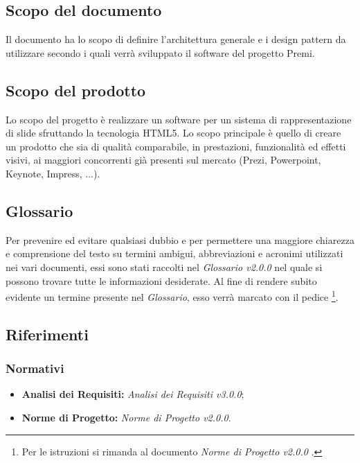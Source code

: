 \subsection{Scopo del documento}
	Il documento ha lo scopo di definire l'architettura generale e i \gls{design pattern} da utilizzare secondo i quali verrà sviluppato il software del progetto Premi.
	
\subsection{Scopo del prodotto}
Lo scopo del progetto è realizzare un software per un sistema di rappresentazione di \gls{slide} sfruttando la tecnologia  \gls{HTML5}. Lo scopo principale è quello di creare un prodotto che sia di qualità comparabile, in prestazioni, funzionalità ed effetti visivi, ai maggiori concorrenti già presenti sul mercato (Prezi, Powerpoint, Keynote, Impress, ...).

\subsection{Glossario}
Per prevenire ed evitare qualsiasi dubbio e per permettere una maggiore chiarezza e comprensione del testo su termini ambigui, abbreviazioni e acronimi utilizzati nei vari documenti, essi sono stati raccolti nel \textit{Glossario v2.0.0} nel quale si possono trovare tutte le informazioni desiderate.
Al fine di rendere subito evidente un termine presente nel \textit{Glossario}, esso verrà marcato con il pedice \G\footnote{Per le istruzioni si rimanda al documento \textit{Norme di Progetto v2.0.0} .}.

\subsection{Riferimenti}

\subsubsection{Normativi}
	\begin{itemize}
		\item \textbf{Analisi dei Requisiti:} \textit{Analisi dei Requisiti v3.0.0};
		\item \textbf{Norme di Progetto:} \textit{Norme di Progetto v2.0.0}.
	\end{itemize}
	
